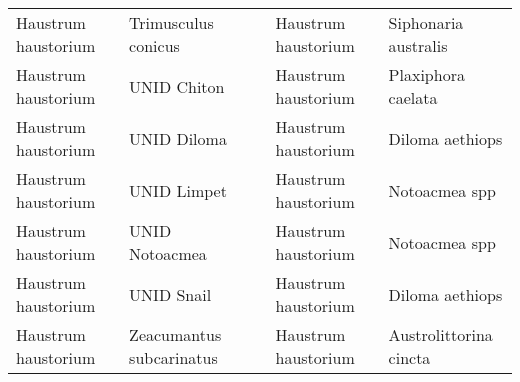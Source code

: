 \begin{table}[!htbp]
\begin{center}
\begin{tabular}{llcll}
Haustrum haustorium&Trimusculus conicus&&Haustrum haustorium&Siphonaria australis\tabularnewline
Haustrum haustorium&UNID Chiton&&Haustrum haustorium&Plaxiphora caelata\tabularnewline
Haustrum haustorium&UNID Diloma&&Haustrum haustorium&Diloma aethiops\tabularnewline
Haustrum haustorium&UNID Limpet&&Haustrum haustorium&Notoacmea spp\tabularnewline
Haustrum haustorium&UNID Notoacmea&&Haustrum haustorium&Notoacmea spp\tabularnewline
Haustrum haustorium&UNID Snail&&Haustrum haustorium&Diloma aethiops\tabularnewline
Haustrum haustorium&Zeacumantus subcarinatus&&Haustrum haustorium&Austrolittorina cincta\tabularnewline
\hline
\end{tabular}\end{center}
\end{table}
